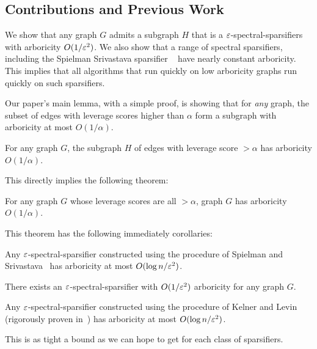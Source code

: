 
\subsection{Contributions and Previous Work}

We show that any graph $G$ admits a subgraph $H$ that is a
$\varepsilon$-spectral-sparsifiers with arboricity
$O(1/\varepsilon^2)$. We also show that a range of spectral sparsifiers,
including
the Spielman Srivastava sparsifier ~\cite{SpielmanS08} have nearly
constant arboricity. This implies that all algorithms that run quickly on low
arboricity graphs run quickly on such sparsifiers.

Our paper's main lemma, with a simple proof,
is showing that for \textit{any} graph, the subset of edges
with leverage scores higher than $\alpha$ form a subgraph with
arboricity at most $O(1/ \alpha)$.

\begin{lemma} \label{lem:main} For any graph $G$, the subgraph $H$ of
  edges with leverage score $ > \alpha$ has arboricity $O(1 / \alpha)$.
\end{lemma}

This directly implies the following
theorem:

\begin{theorem}\label{thm:main}
  For any graph $G$ whose leverage scores are all $ > \alpha$, graph $G$
  has arboricity $O(1/ \alpha)$.
\end{theorem}

This theorem has the following immediately corollaries: 
\begin{corollary} \label{cor:ss}
  Any $\varepsilon$-spectral-sparsifier constructed using the procedure of Spielman and
  Srivastava~\cite{SpielmanS08} has arboricity at most $O(\log n /
  \varepsilon^2)$.
\end{corollary}

\begin{corollary}\label{cor:mss}
  There exists an
  $\varepsilon$-spectral-sparsifier with $O(1/\varepsilon^2)$ arboricity for any graph
  $G$.
\end{corollary}

\begin{corollary}\label{cor:kl}
  Any $\varepsilon$-spectral-sparsifier constructed using the procedure of Kelner and
  Levin~\cite{KelnerL13} (rigorously proven in~\cite{Pachocki16, KyngPPS16}) has arboricity at most
  $O(\log n / \varepsilon^2)$.
\end{corollary}
This is as tight a bound as we can hope to get for each class of
sparsifiers.
  
